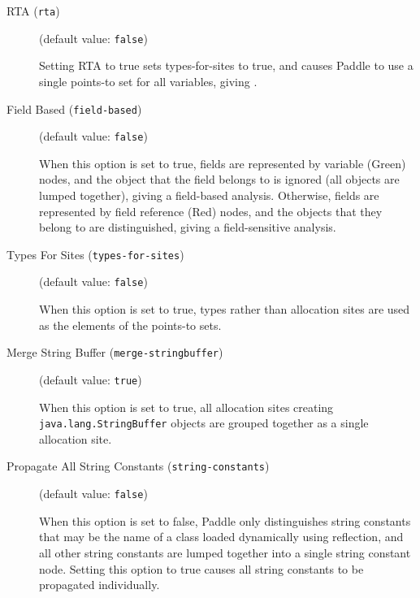 \documentclass{article}
\begin{document}
\begin{description}

\item[RTA ({\tt rta})]
(default value: {\tt false})




Setting RTA to true sets types-for-sites to true, and causes Paddle to use
a single points-to set for all variables, giving .
        


\item[Field Based ({\tt field-based})]
(default value: {\tt false})




When this option is set to true, fields are represented by variable
(Green) nodes, and the object that the field belongs to is ignored
(all objects are lumped together), giving a field-based analysis. Otherwise, fields are represented by
field reference (Red) nodes, and the objects that they belong to are
distinguished, giving a field-sensitive analysis.
        


\item[Types For Sites ({\tt types-for-sites})]
(default value: {\tt false})




When this option is set to true, types rather than allocation sites are
used as the elements of the points-to sets.
        


\item[Merge String Buffer ({\tt merge-stringbuffer})]
(default value: {\tt true})




When this option is set to true, all allocation sites creating
{\tt java.lang.StringBuffer} objects are grouped together as a single
allocation site.
        


\item[Propagate All String Constants ({\tt string-constants})]
(default value: {\tt false})




When this option is set to false, Paddle only distinguishes string constants that
may be the name of a class loaded dynamically using reflection, and all other
string constants are lumped together into a single string constant node.
Setting this option to true causes all string constants to be propagated
individually.
        



\end{description}
\end{document}
